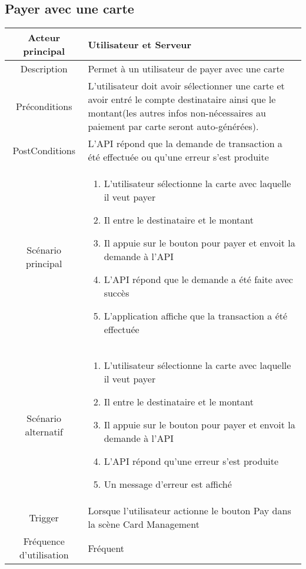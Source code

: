 \documentclass{article}
\begin{document}
\subsection{Payer avec une carte}
    \begin{table}[h]
        \begin{tabular}{|c|p{10cm}|}
        \hline
        Acteur principal& Utilisateur et Serveur    \\
        \hline
        Description&  Permet à un utilisateur de payer avec une carte  \\
        \hline
        Préconditions&   L'utilisateur doit avoir sélectionner une carte et avoir entré
             le compte destinataire ainsi que le montant(les autres infos non-nécessaires
             au paiement par carte seront auto-générées). \\
        \hline
        PostConditions&  L'API répond que la demande de transaction a été effectuée ou qu'une erreur s'est produite    \\
        \hline
        Scénario principal& 
                \begin{enumerate}
                    \item L'utilisateur sélectionne la carte avec laquelle il veut payer
                    \item Il entre le destinataire et le montant
                    \item Il appuie sur le bouton pour payer et envoit la demande à l'API
                    \item L'API répond que le demande a été faite avec succès
                    \item L'application affiche que la transaction a été effectuée
                \end{enumerate}     \\
        \hline
        Scénario alternatif&  
        \begin{enumerate}
            \item L'utilisateur sélectionne la carte avec laquelle il veut payer
            \item Il entre le destinataire et le montant
            \item Il appuie sur le bouton pour payer et envoit la demande à l'API
            \item L'API répond qu'une erreur s'est produite
            \item Un message d'erreur est affiché
        \end{enumerate}    \\
        \hline
        Trigger&   Lorsque l'utilisateur actionne le bouton Pay dans la scène Card Management   \\
        \hline
        Fréquence d'utilisation&   Fréquent  \\
        \hline
        \end{tabular}
    \end{table}
\end{document}

